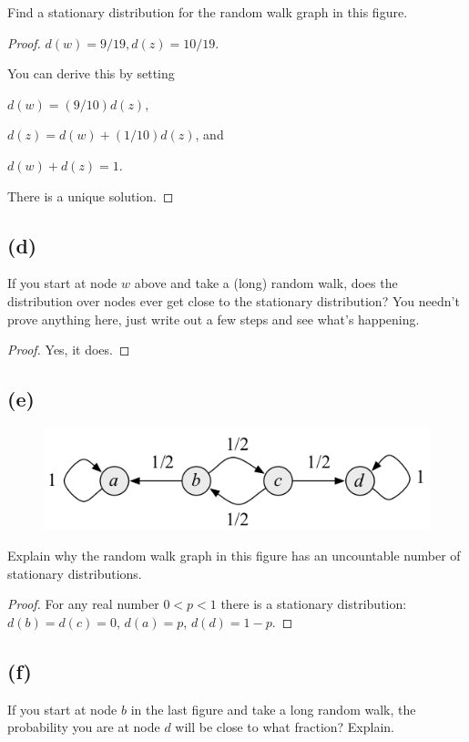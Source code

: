 \documentclass[14pt]{extarticle}
\begin{document}
Find a stationary distribution for the random walk graph in this figure.

\begin{proof}
$d(w) = 9/19, d(z) = 10/19$. 

You can derive this by setting 

$d(w) = (9/10)d(z)$, 

$d(z) = d(w) + (1/10)d(z)$, and 

$d(w) + d(z) = 1$. 

There is a unique solution.
\end{proof}

\subsection{(d)}
If you start at node $w$ above and take a (long) random walk, does the distribution over nodes ever get close to the stationary distribution? You needn’t prove anything here, just write out a few steps and see what’s happening.

\begin{proof}
Yes, it does.
\end{proof}

\subsection{(e)}
\begin{figure}[ht!]
\centering
\includegraphics[scale=0.6]{random-walk-3.png}
\end{figure}
Explain why the random walk graph in this figure has an uncountable number of stationary distributions.

\begin{proof}
For any real number $0 < p < 1$ there is a stationary distribution: $d(b) = d(c) = 0$, $d(a) = p$, $d(d) = 1-p$.
\end{proof}

\subsection{(f)}
If you start at node $b$ in the last figure and take a long random walk, the probability you are at node $d$ will be close to what fraction? Explain.
\end{document}
